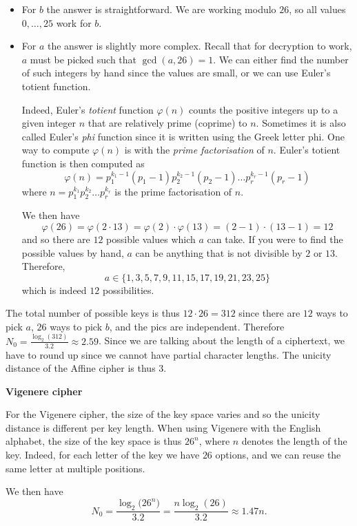 \documentclass{practice}
\begin{document}
\begin{itemize}
  \item For $b$ the answer is straightforward.
  We are working modulo $26$, so all values $0, \dots, 25$ work for $b$.
  \item For $a$ the answer is slightly more complex.
  Recall that for decryption to work, $a$ must be picked such that $\gcd(a, 26) = 1$.
  We can either find the number of such integers by hand since the values are small, or we can use Euler's totient function.

  Indeed, Euler's \emph{totient} function $\varphi(n)$ counts the positive integers up to a given integer $n$ that are relatively prime (coprime) to $n$.
  Sometimes it is also called Euler's \emph{phi} function since it is written using the Greek letter phi.
  One way to compute $\varphi(n)$ is with the \emph{prime factorisation}\footnotemark{} of $n$.
  Euler's totient function is then computed as
  \[
    \varphi(n) = p_1^{k_1 - 1}(p_1 - 1) p_2^{k_2 - 1}(p_2 - 1) \dots p_r^{k_r - 1}(p_r - 1)
  \]
  where $n = p_1^{k_1}p_2^{k_2}\dots p_r^{k_r}$ is the prime factorisation of $n$.

  We then have
  \[
    \varphi(26) = \varphi(2 \cdot 13) = \varphi(2) \cdot \varphi(13) = (2-1) \cdot (13 - 1) = 12
  \]
  and so there are $12$ possible values which $a$ can take.
  If you were to find the possible values by hand, $a$ can be anything that is not divisible by $2$ or $13$.
  Therefore,
  \[
    a\in\{1, 3, 5, 7, 9, 11, 15, 17, 19, 21, 23, 25\}
  \]
  which is indeed $12$ possibilities.
\end{itemize}

The total number of possible keys is thus $12 \cdot 26 = 312$ since there are $12$ ways to pick $a$, $26$ ways to pick $b$, and the pics are independent.
Therefore $N_0 = \frac{\log_2(312)}{3.2} \approx 2.59$.
Since we are talking about the length of a ciphertext, we have to round up since we cannot have partial character lengths.
The unicity distance of the Affine cipher is thus $3$.

\vspace*{1em}

\textbf{Vigenere cipher}

For the Vigenere cipher, the size of the key space varies and so the unicity distance is different per key length.
When using Vigenere with the English alphabet, the size of the key space is thus $26^n$, where $n$ denotes the length of the key.
Indeed, for each letter of the key we have $26$ options, and we can reuse the same letter at multiple positions.

We then have
\[
  N_0 = \frac{\log_2\bigl(26^n\bigr)}{3.2} = \frac{n\log_2(26)}{3.2} \approx 1.47n.
\]
\end{document}
